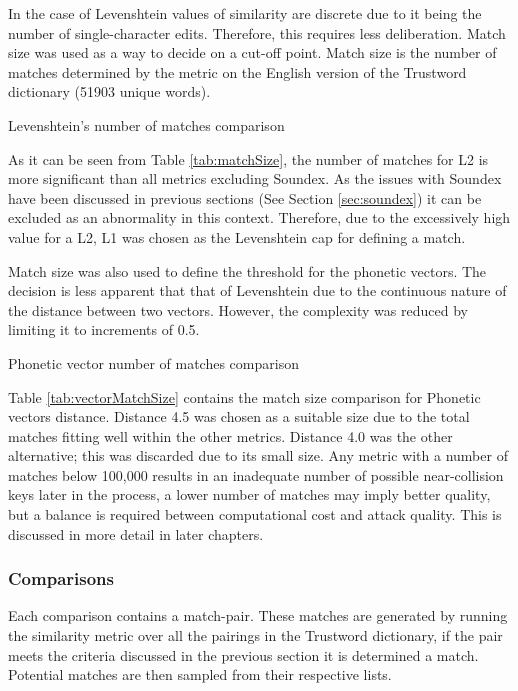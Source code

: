 In the case of Levenshtein values of similarity are discrete due to it being the number of single-character edits. Therefore, this requires less deliberation. Match size was used as a way to decide on a cut-off point. Match size is the number of matches determined by the metric on the English version of the Trustword dictionary (51903 unique words).

\begin{table}[h!]
    \centering
    
    \caption{Levenshtein's number of matches comparison}
    \label{tab:matchSize}
\end{table}

As it can be seen from Table \ref{tab:matchSize}, the number of matches for L2 is more significant than all metrics excluding Soundex. As the issues with Soundex have been discussed in previous sections (See Section \ref{sec:soundex}) it can be excluded as an abnormality in this context. Therefore, due to the excessively high value for a L2, L1 was chosen as the Levenshtein cap for defining a match.

Match size was also used to define the threshold for the phonetic vectors. The decision is less apparent that that of Levenshtein due to the continuous nature of the distance between two vectors. However, the complexity was reduced by limiting it to increments of 0.5.

\begin{table}[h!]
    \centering
    
    \caption{Phonetic vector number of matches comparison}
    \label{tab:vectorMatchSize}
\end{table}

Table \ref{tab:vectorMatchSize} contains the match size comparison for Phonetic vectors distance. Distance 4.5 was chosen as a suitable size due to the total matches fitting well within the other metrics. Distance 4.0 was the other alternative; this was discarded due to its small size. Any metric with a number of matches below 100,000 results in an inadequate number of possible near-collision keys later in the process, a lower number of matches may imply better quality, but a balance is required between computational cost and attack quality. This is discussed in more detail in later chapters.

\subsubsection{Comparisons}
\label{sec:exp1_comparison}
Each comparison contains a match-pair. These matches are generated by running the similarity metric over all the pairings in the Trustword dictionary, if the pair meets the criteria discussed in the previous section it is determined a match. Potential matches are then sampled from their respective lists.

